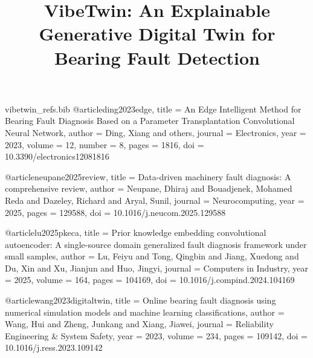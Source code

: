 \begin{filecontents*}{vibetwin_refs.bib}
@article{ding2023edge,
  title   = {An Edge Intelligent Method for Bearing Fault Diagnosis Based on a Parameter Transplantation Convolutional Neural Network},
  author  = {Ding, Xiang and others},
  journal = {Electronics},
  year    = {2023},
  volume  = {12},
  number  = {8},
  pages   = {1816},
  doi     = {10.3390/electronics12081816}
}

@article{neupane2025review,
  title   = {Data-driven machinery fault diagnosis: A comprehensive review},
  author  = {Neupane, Dhiraj and Bouadjenek, Mohamed Reda and Dazeley, Richard and Aryal, Sunil},
  journal = {Neurocomputing},
  year    = {2025},
  pages   = {129588},
  doi     = {10.1016/j.neucom.2025.129588}
}

@article{lu2025pkeca,
  title   = {Prior knowledge embedding convolutional autoencoder: A single-source domain generalized fault diagnosis framework under small samples},
  author  = {Lu, Feiyu and Tong, Qingbin and Jiang, Xuedong and Du, Xin and Xu, Jianjun and Huo, Jingyi},
  journal = {Computers in Industry},
  year    = {2025},
  volume  = {164},
  pages   = {104169},
  doi     = {10.1016/j.compind.2024.104169}
}

@article{wang2023digitaltwin,
  title   = {Online bearing fault diagnosis using numerical simulation models and machine learning classifications},
  author  = {Wang, Hui and Zheng, Junkang and Xiang, Jiawei},
  journal = {Reliability Engineering \& System Safety},
  year    = {2023},
  volume  = {234},
  pages   = {109142},
  doi     = {10.1016/j.ress.2023.109142}
}
\end{filecontents*}

\documentclass[conference]{IEEEtran}
\usepackage{cite}
\usepackage{graphicx}
\usepackage{url}
\usepackage{amsmath}
\usepackage{amsfonts}
\usepackage{amssymb}
\usepackage{booktabs}



\title{VibeTwin: An Explainable Generative Digital Twin for Bearing Fault Detection}

\author{
}

\maketitle

